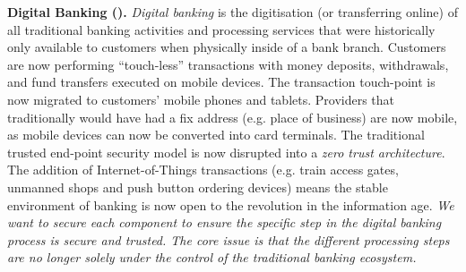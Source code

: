 \begin{Workpackage}{\thewpno}
\begin{Task}

\textbf{Digital Banking (\SOPRAshort{}).} \emph{Digital banking} is the digitisation (or transferring online) of all traditional banking activities and processing services that were historically only available to customers when physically inside of a bank branch. Customers are now performing ``touch-less'' transactions with money deposits, withdrawals, and fund transfers executed on mobile devices. The transaction touch-point is now migrated to customers' mobile phones and tablets. Providers that traditionally would have had a fix address (e.g. place of business) are now mobile, as  mobile devices can now be converted into card terminals. The traditional trusted end-point security model is now disrupted into a \emph{zero trust architecture}. The addition of Internet-of-Things transactions (e.g. train access gates, unmanned shops and push button ordering devices) means the stable environment of banking is now open to the revolution in the information age. \emph{We want to secure each component to ensure the specific step in the digital banking process is secure and trusted. The core issue is that the different processing steps are no longer solely under the control of the traditional banking ecosystem.}


\end{Task}
\end{Workpackage}

